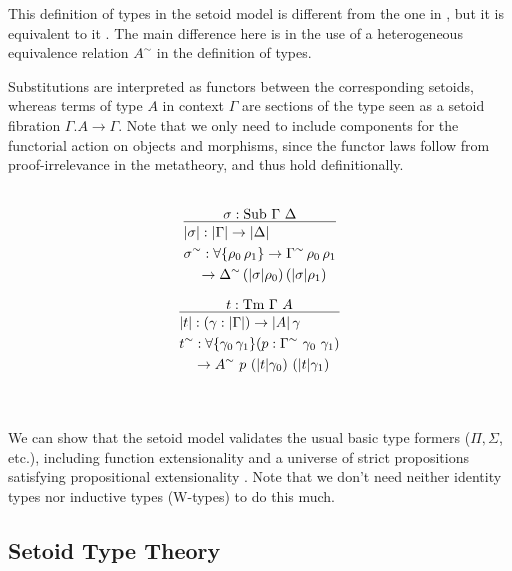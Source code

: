 \documentclass{easychair}
\newcommand{\GG}{\Gamma}
\newcommand{\GD}{\Delta}
\newcommand{\Tm}{\mathrm{Tm}}
\newcommand{\Sub}{\mathrm{Sub}}
\begin{document}
This definition of types in the setoid model is different from the one in
\cite{setoid99}, but it is equivalent to it . The main
difference here is in the use of a heterogeneous equivalence relation $A^\sim$
in the definition of types.

Substitutions are interpreted as functors between the corresponding setoids,
whereas terms of type $A$ in context $\GG$ are sections of the type seen as a
setoid fibration $\GG . A \to \GG$. Note that we only need to include components
for the functorial action on objects and morphisms, since the functor laws
follow from proof-irrelevance in the metatheory, and thus hold definitionally.
\\
~
\\
\begin{minipage}{0.5\textwidth}
\[
\infer{
  \begin{aligned}
    & | \sigma | : | \GG | \to | \GD | \\
    & \sigma^\sim : \forall\{\rho_0\, \rho_1\} \to \GG^\sim\, \rho_0\, \rho_1 \\
    & \quad \to \GD^\sim\, (|\sigma|\rho_0)\, (|\sigma|\rho_1)
  \end{aligned}
}{
  \sigma : \Sub\ \GG\ \GD
}
\]
\end{minipage}
\begin{minipage}{0.5\textwidth}
\[
\infer{
  \begin{aligned}
    & | t | : (\gamma : | \GG |) \to | A | \, \gamma \\
    & t^\sim : \forall\{\gamma_0\, \gamma_1\}
    (p : \GG^\sim\ \gamma_0\ \gamma_1) \\
    & \quad \to A^\sim\ p\ (|t|\gamma_0)\ (|t|\gamma_1)
  \end{aligned}
}{
  t : \Tm\ \GG\ A
}
\]
\end{minipage}
\\
~
\\
We can show that the setoid model validates the usual basic type formers ($\Pi,
\Sigma$, etc.), including function extensionality and a universe of strict
propositions satisfying propositional extensionality \cite{setoid99}. Note that
we don't need neither identity types nor inductive types (W-types) to do this
much.

\subsection{Setoid Type Theory}\label{sett}
\end{document}
